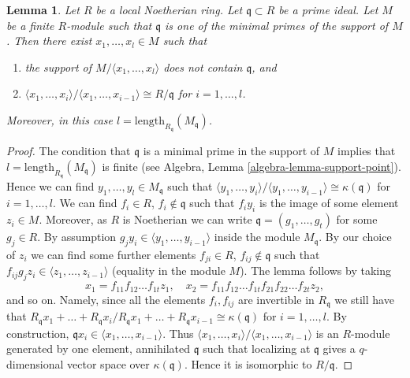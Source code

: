 \documentclass[10pt,a4paper]{amsart}
\theoremstyle{plain}
\newtheorem{lemma}[subsection]{Lemma}
\theoremstyle{definition}
\theoremstyle{remark}
\numberwithin{equation}{subsection}
\begin{document}
\begin{lemma}
\label{lemma-good-sequence-exists}
Let $R$ be a local Noetherian ring.
Let $\mathfrak q \subset R$ be a prime ideal.
Let $M$ be a finite $R$-module such that
$\mathfrak q$ is one of the minimal primes of the support of $M$.
Then there exist $x_1, \ldots, x_l \in M$ such that
\begin{enumerate}
\item the support of $M / \langle x_1, \ldots, x_l\rangle$ does not contain
$\mathfrak q$, and
\item $\langle x_1, \ldots, x_i\rangle / \langle x_1, \ldots, x_{i - 1}\rangle
\cong R/\mathfrak q$ for $i = 1, \ldots, l$.
\end{enumerate}
Moreover, in this case $l = \text{length}_{R_\mathfrak q}(M_\mathfrak q)$.
\end{lemma}

\begin{proof}
The condition that $\mathfrak q$ is a minimal prime in the support
of $M$ implies that $l = \text{length}_{R_\mathfrak q}(M_\mathfrak q)$
is finite (see Algebra, Lemma \ref{algebra-lemma-support-point}).
Hence we can find $y_1, \ldots, y_l \in M_{\mathfrak q}$
such that
$\langle y_1, \ldots, y_i\rangle / \langle y_1, \ldots, y_{i - 1}\rangle
\cong \kappa(\mathfrak q)$ for $i = 1, \ldots, l$.
We can find $f_i \in R$, $f_i \not \in \mathfrak q$ such that
$f_i y_i$ is the image of some element $z_i \in M$.
Moreover, as $R$ is Noetherian we can write
$\mathfrak q = (g_1, \ldots, g_t)$ for some $g_j \in R$.
By assumption $g_j y_i \in \langle y_1, \ldots, y_{i - 1} \rangle$
inside the module $M_{\mathfrak q}$.
By our choice of $z_i$ we can find some further elements
$f_{ji} \in R$, $f_{ij} \not \in \mathfrak q$ such that
$f_{ij} g_j z_i \in \langle z_1, \ldots, z_{i - 1} \rangle$
(equality in the module $M$).
The lemma follows by taking
$$
x_1 = f_{11}f_{12}\ldots f_{1t}z_1,
\quad
x_2 = f_{11}f_{12}\ldots f_{1t}f_{21}f_{22}\ldots f_{2t}z_2,
$$
and so on. Namely, since all the elements $f_i, f_{ij}$ are invertible
in $R_{\mathfrak q}$ we still have that
$R_{\mathfrak q}x_1 + \ldots + R_{\mathfrak q}x_i /
R_{\mathfrak q}x_1 + \ldots + R_{\mathfrak q}x_{i - 1}
\cong \kappa(\mathfrak q)$ for $i = 1, \ldots, l$.
By construction, $\mathfrak q x_i \in \langle x_1, \ldots, x_{i - 1}\rangle$.
Thus $\langle x_1, \ldots, x_i\rangle / \langle x_1, \ldots, x_{i - 1}\rangle$
is an $R$-module generated by one element, annihilated $\mathfrak q$
such that localizing at $\mathfrak q$ gives a $q$-dimensional
vector space over $\kappa(\mathfrak q)$.
Hence it is isomorphic to $R/\mathfrak q$.
\end{proof}
\end{document}
